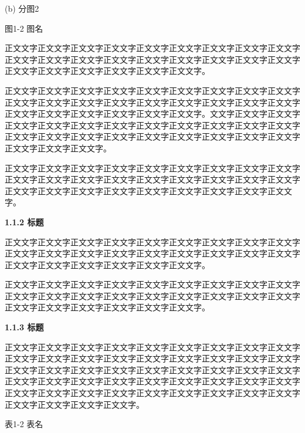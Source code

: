 \documentclass[
]{article}
\begin{document}
(b) 分图2

图1-2 图名

正文文字正文文字正文文字正文文字正文文字正文文字正文文字正文文字正文文字正文文字正文文字正文文字正文文字正文文字正文文字正文文字正文文字正文文字正文文字正文文字正文文字正文文字正文文字正文文字。

正文文字正文文字正文文字正文文字正文文字正文文字正文文字正文文字正文文字正文文字正文文字正文文字正文文字正文文字正文文字正文文字正文文字正文文字正文文字正文文字正文文字正文文字正文文字正文文字。文文字正文文字正文文字正文文字正文文字正文文字正文文字正文文字正文文字正文文字正文文字正文文字正文文字正文文字正文文字正文文字正文文字正文文字正文文字正文文字正文文字正文文字正文文字正文文字。

正文文字正文文字正文文字正文文字正文文字正文文字正文文字正文文字正文文字正文文字正文文字正文文字正文文字正文文字正文文字正文文字正文文字正文文字正文文字正文文字正文文字正文文字正文文字正文文字正文文字正文文字正文文字。

\protect{}\label{_Toc26435}{}\textbf{1.1.2 标题}

正文文字正文文字正文文字正文文字正文文字正文文字正文文字正文文字正文文字正文文字正文文字正文文字正文文字正文文字正文文字正文文字正文文字正文文字正文文字正文文字正文文字正文文字正文文字正文文字。

正文文字正文文字正文文字正文文字正文文字正文文字正文文字正文文字正文文字正文文字正文文字正文文字正文文字正文文字正文文字正文文字正文文字正文文字正文文字正文文字正文文字正文文字正文文字正文文字。

\protect{}\label{_Toc32459}{}\textbf{1.1.3 标题}

正文文字正文文字正文文字正文文字正文文字正文文字正文文字正文文字正文文字正文文字正文文字正文文字正文文字正文文字正文文字正文文字正文文字正文文字正文文字正文文字正文文字正文文字正文文字正文文字正文文字正文文字正文文字正文文字正文文字正文文字正文文字正文文字正文文字正文文字正文文字正文文字正文文字正文文字正文文字正文文字正文文字正文文字正文文字正文文字正文文字正文文字正文文字正文文字正文文字。

表1-2 表名
\end{document}
